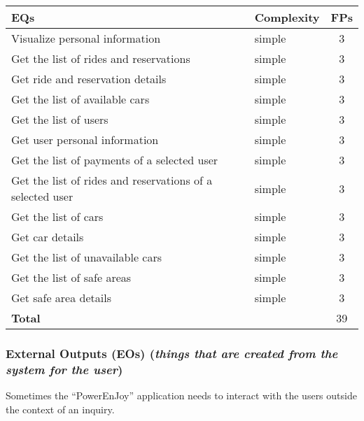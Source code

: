 \begin{center}
	\begin{tabular}{|l|l|c|}
		\hline
		\textbf{EQs} 	& \textbf{Complexity} 	& \textbf{FPs} \\
		\hline
		Visualize personal information 	& simple 	& 3 \\
		Get the list of rides and reservations 	& simple 	& 3 \\
		Get ride and reservation details 	& simple 	& 3 \\
		Get the list of available cars 	& simple 	& 3 \\
		Get the list of users 	& simple 	& 3 \\
		Get user personal information 	& simple 	& 3 \\
		Get the list of payments of a selected user 	& simple 	& 3\\
		Get the list of rides and reservations of a selected user 	& simple 	& 3 \\
		Get the list of cars 	& simple 	& 3 \\
		Get car details 	& simple 	& 3 \\
		Get the list of unavailable cars 	& simple 	& 3 \\
		Get the list of safe areas 	& simple 	& 3 \\
		Get safe area details 	& simple 	& 3 \\
		\hline \hline
		\textbf{Total} 	& 	& 39 \\
		\hline
	\end{tabular}
\end{center}

\subsubsection{External Outputs (EOs) (\textit{things that are created from the system for the user})}

Sometimes the ``PowerEnJoy'' application needs to interact with the users outside the context of an inquiry.

